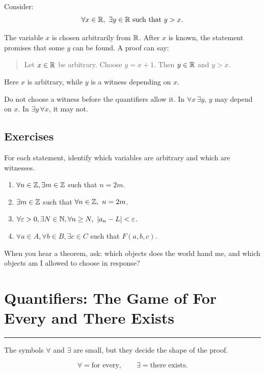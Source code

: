 \documentclass[12pt]{article}
\newcommand{\chapterline}{\vspace{0.4em}\hrule\vspace{0.8em}}
\begin{document}
Consider:
\[
\forall x\in\mathbb{R},\ \exists y\in\mathbb{R}\text{ such that } y>x.
\]

The variable $x$ is chosen arbitrarily from $\mathbb{R}$. After $x$ is known, the statement promises that some $y$ can be found. A proof can say:

\begin{quote}
Let $x\in\mathbb{R}$ be arbitrary. Choose $y=x+1$. Then $y\in\mathbb{R}$ and $y>x$.
\end{quote}

Here $x$ is arbitrary, while $y$ is a witness depending on $x$.

\begin{trapbox}
Do not choose a witness before the quantifiers allow it. In $\forall x\,\exists y$, $y$ may depend on $x$. In $\exists y\,\forall x$, it may not.
\end{trapbox}

\subsection{Exercises}

For each statement, identify which variables are arbitrary and which are witnesses.

\begin{enumerate}
\item $\forall n\in\mathbb{Z},\exists m\in\mathbb{Z}$ such that $n=2m$.
\item $\exists m\in\mathbb{Z}$ such that $\forall n\in\mathbb{Z},\ n=2m$.
\item $\forall \varepsilon>0,\exists N\in\mathbb{N},\forall n\geq N,\ |a_n-L|<\varepsilon$.
\item $\forall a\in A,\forall b\in B,\exists c\in C$ such that $F(a,b,c)$.
\end{enumerate}

\begin{walkbox}
When you hear a theorem, ask: which objects does the world hand me, and which objects am I allowed to choose in response?
\end{walkbox}

\newpage
\section{Quantifiers: The Game of For Every and There Exists}
\chapterline

The symbols $\forall$ and $\exists$ are small, but they decide the shape of the proof.

\[
\forall = \text{for every},\qquad \exists = \text{there exists}.
\]
\end{document}
